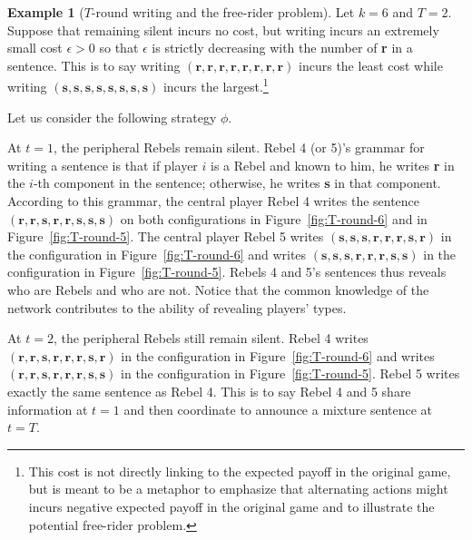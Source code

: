 \documentclass[12pt,letter]{article}
\theoremstyle{definition}
\newtheorem{example}{Example}
\theoremstyle{definition}
\theoremstyle{remark}
\theoremstyle{claim}
\begin{document}
\begin{example}[$T$-round writing and the free-rider problem]
\label{ex:cost_function_talk_fr}
Let $k=6$ and $T=2$. Suppose that remaining silent incurs no cost, but writing incurs an extremely small cost $\epsilon>0$ so that $\epsilon$ is strictly decreasing with the number of \textbf{r} in a sentence. This is to say writing $(\textbf{r},\textbf{r},\textbf{r},\textbf{r},\textbf{r},\textbf{r},\textbf{r},\textbf{r})$ incurs the least cost while writing $(\textbf{s},\textbf{s},\textbf{s},\textbf{s},\textbf{s},\textbf{s},\textbf{s},\textbf{s})$ incurs the largest.\footnote{This cost is not directly linking to the expected payoff in the original game, but is meant to be a metaphor to emphasize that alternating actions might incurs negative expected payoff in the original game and to illustrate the potential free-rider problem.} 

Let us consider the following strategy $\phi$. 

At $t=1$, the peripheral Rebels remain silent. Rebel 4 (or 5)'s grammar for writing a sentence is that if player $i$ is a Rebel and known to him, he writes \textbf{r} in the $i$-th component in the sentence; otherwise, he writes \textbf{s} in that component. According to this grammar, the central player Rebel 4 writes the sentence $(\textbf{r},\textbf{r},\textbf{s},\textbf{r},\textbf{r},\textbf{s},\textbf{s},\textbf{s})$ on both configurations in Figure~\ref{fig:T-round-6} and in Figure~\ref{fig:T-round-5}. The central player Rebel 5 writes $(\textbf{s},\textbf{s},\textbf{s},\textbf{r},\textbf{r},\textbf{r},\textbf{s},\textbf{r})$ in the configuration in Figure~\ref{fig:T-round-6} and writes $(\textbf{s},\textbf{s},\textbf{s},\textbf{r},\textbf{r},\textbf{r},\textbf{s},\textbf{s})$ in the configuration in Figure~\ref{fig:T-round-5}. Rebels 4 and 5's sentences thus reveals who are Rebels and who are not. Notice that the common knowledge of the network contributes to the ability of revealing players' types. 

At $t=2$, the peripheral Rebels still remain silent. Rebel 4 writes $(\textbf{r},\textbf{r},\textbf{s},\textbf{r},\textbf{r},\textbf{r},\textbf{s},\textbf{r})$ in the configuration in Figure~\ref{fig:T-round-6} and writes $(\textbf{r},\textbf{r},\textbf{s},\textbf{r},\textbf{r},\textbf{r},\textbf{s},\textbf{s})$ in the configuration in Figure~\ref{fig:T-round-5}. Rebel 5 writes exactly the same sentence as Rebel 4. This is to say Rebel 4 and 5 share information at $t=1$ and then coordinate to announce a mixture sentence at $t=T$. 


\end{example}
\end{document}
